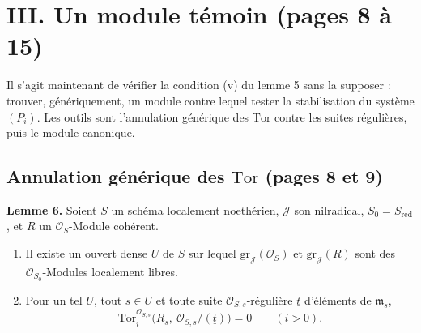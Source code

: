 \documentclass[11pt,a4paper]{article}
\begin{document}
\section*{III. Un module témoin (pages 8 à 15)}

Il s'agit maintenant de vérifier la condition (v) du lemme 5 sans la
supposer : trouver, génériquement, un module contre lequel tester la
stabilisation du système $(P_i)$. Les outils sont l'annulation générique des
$\mathrm{Tor}$ contre les suites régulières, puis le module canonique.

\subsection*{Annulation générique des $\mathrm{Tor}$ (pages 8 et 9)}

\textbf{Lemme 6.} Soient $S$ un schéma localement noethérien, $\mathcal{J}$ son
nilradical, $S_0 = S_{\mathrm{red}}$, et $R$ un $\mathcal{O}_S$-Module cohérent.
\begin{enumerate}
\item[a)] Il existe un ouvert dense $U$ de $S$ sur lequel
$\mathrm{gr}_{\mathcal{J}}(\mathcal{O}_S)$ et $\mathrm{gr}_{\mathcal{J}}(R)$
sont des $\mathcal{O}_{S_0}$-Modules localement libres.
\item[b)] Pour un tel $U$, tout $s \in U$ et toute suite
$\mathcal{O}_{S,s}$-régulière $\underline{t}$ d'éléments de $\mathfrak{m}_s$,
\[
  \mathrm{Tor}_i^{\mathcal{O}_{S,s}}\bigl(R_s,\ \mathcal{O}_{S,s}/(\underline{t})\bigr) = 0
  \qquad (i > 0) .
\]
\end{enumerate}
\end{document}
